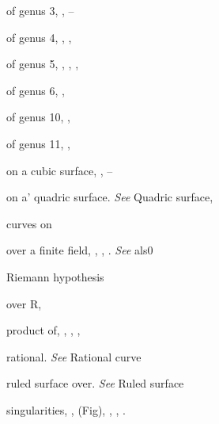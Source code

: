 {{\noindent\hspace*{7.5bp}of genus 3, , --\par
\noindent\hspace*{7.5bp}of genus 4, , , \par
\noindent\hspace*{7.5bp}of genus 5, , , , \par
\noindent\hspace*{7.5bp}of genus 6, , \par
\noindent\hspace*{7.5bp}of genus 10, , \par
\noindent\hspace*{7.5bp}of genus 11, , \par
\noindent\hspace*{7.5bp}on a cubic surface, , --\par
\noindent\hspace*{7.5bp}on a' quadric surface. \emph{See} Quadric surface,\par
\noindent\hspace*{15.0bp}curves on\par
\noindent\hspace*{7.5bp}over a finite field, , , . \emph{See} als0\par
\noindent\hspace*{15.0bp}Riemann hypothesis\par
\noindent\hspace*{7.5bp}over R, \par
\noindent\hspace*{7.5bp}product of, , , , \par
\noindent\hspace*{7.5bp}rational. \emph{See} Rational curve\par
\noindent\hspace*{7.5bp}ruled surface over. \emph{See} Ruled surface\par
\noindent\hspace*{7.5bp}singularities, ,  (Fig), , , .\par
}}
